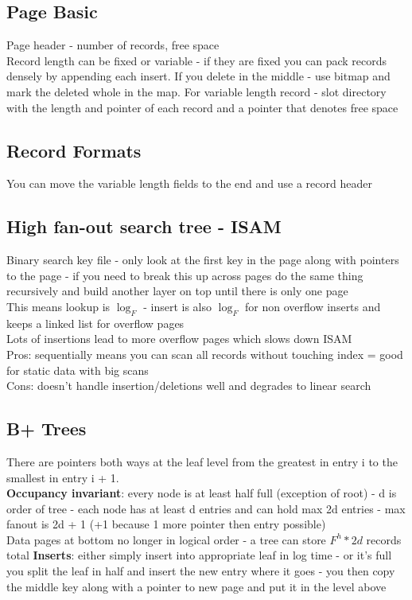 \documentclass{article}
\begin{document}
\subsection{Page Basic}
Page header - number of records, free space \\
Record length can be fixed or variable - if they are fixed you can pack records densely by appending each insert. If you delete in the middle - use bitmap and mark the deleted whole in the map. For variable length record - slot directory with the length and pointer of each record and a pointer that denotes free space
\subsection{Record Formats}
You can move the variable length fields to the end and use a record header
\subsection{High fan-out search tree - ISAM}
Binary search key file - only look at the first key in the page along with pointers to the page - if you need to break this up across pages do the same thing recursively and build another layer on top until there is only one page \\ 
This means lookup is $\log_F$ - insert is also $\log_F$ for non overflow inserts and keeps a linked list for overflow pages \\
Lots of insertions lead to more overflow pages which slows down ISAM \\ 
Pros: sequentially means you can scan all records without touching index = good for static data with big scans \\
Cons: doesn't handle insertion/deletions well and degrades to linear search
\subsection{B+ Trees}
There are pointers both ways at the leaf level from the greatest in entry i to the smallest in entry i + 1. \\
\textbf{Occupancy invariant}: every node is at least half full (exception of root) - d is order of tree - each node has at least d entries and can hold max 2d entries - max fanout is 2d + 1 (+1 because 1 more pointer then entry possible) \\
Data pages at bottom no longer in logical order - a tree can store $F^h * 2d$ records total
\textbf{Inserts}: either simply insert into appropriate leaf in log time - or it's full you split the leaf in half and insert the new entry where it goes - you then copy the middle key along with a pointer to new page and put it in the level above
\end{document}
